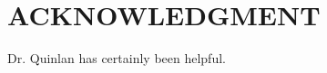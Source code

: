 \documentclass[letterpaper, 10 pt, conference]{ieeeconf}  %
\begin{document}
\section*{ACKNOWLEDGMENT}

Dr. Quinlan has certainly been helpful.








\end{document}
